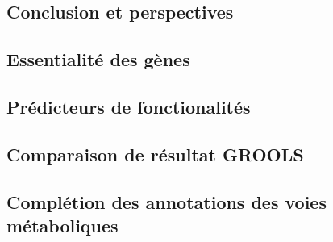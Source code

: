 
\begin{refsegment}
\chapter{Conclusion et perspectives}

\section{Essentialité des gènes}
\section{Prédicteurs de fonctionalités}
\section{Comparaison de résultat GROOLS}
\section{Complétion des annotations des voies métaboliques}


\subbibliography
\end{refsegment}